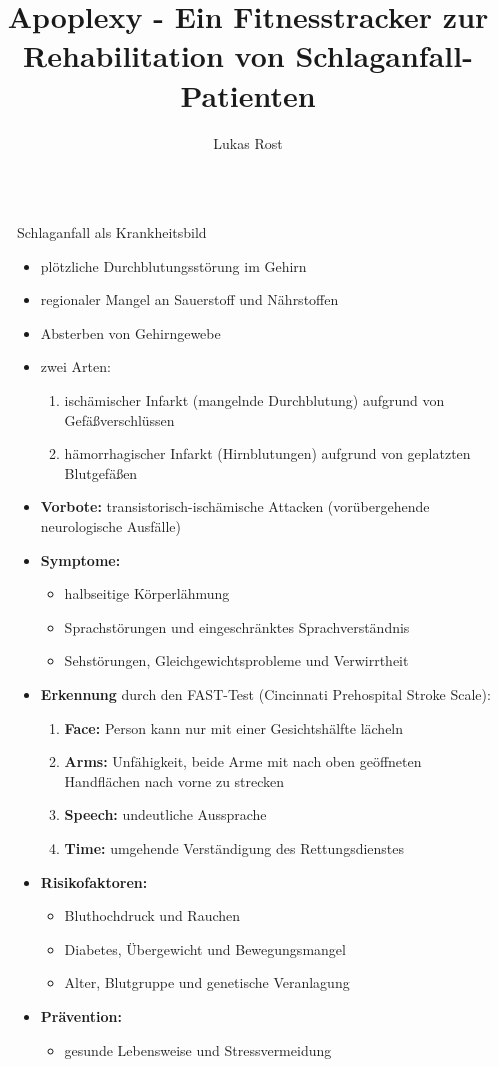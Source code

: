 \documentclass[final,20pt]{beamer}
\title{Apoplexy - Ein Fitnesstracker zur Rehabilitation von Schlaganfall-Patienten}
\author{Lukas Rost}
\institute{Albert-Schweitzer-Gymnasium Erfurt}
\newlength{\sepwidth}
\newlength{\colwidth}
\newcommand{\separatorcolumn}{\begin{column}{\sepwidth}\end{column}}
\begin{document}
\begin{frame}[t]
\begin{columns}[t]
\separatorcolumn

\begin{column}{\colwidth}

  \begin{alertblock}{Schlaganfall als Krankheitsbild}
  	\begin{itemize}
  		\item plötzliche Durchblutungsstörung im Gehirn
  		\item regionaler Mangel an Sauerstoff und Nährstoffen
  		\item Absterben von Gehirngewebe
  		\item zwei Arten:
  		\begin{enumerate}
  			\item ischämischer Infarkt (mangelnde Durchblutung) aufgrund von Gefäßverschlüssen
  			\item hämorrhagischer Infarkt (Hirnblutungen) aufgrund von geplatzten Blutgefäßen
  		\end{enumerate}
  		\item \textbf{Vorbote:} transistorisch-ischämische Attacken (vorübergehende neurologische Ausfälle)
  		\item \textbf{Symptome:}
  		\begin{itemize}
  			\item halbseitige Körperlähmung
  			\item Sprachstörungen und eingeschränktes Sprachverständnis
  			\item Sehstörungen, Gleichgewichtsprobleme und Verwirrtheit
  		\end{itemize}
  		\item \textbf{Erkennung} durch den FAST-Test (Cincinnati Prehospital Stroke Scale):
  		\begin{enumerate}
  			\item \textbf{Face:} Person kann nur mit einer Gesichtshälfte lächeln
  			\item \textbf{Arms:} Unfähigkeit, beide Arme mit nach oben geöffneten Handflächen nach vorne
  			zu strecken
  			\item \textbf{Speech:} undeutliche Aussprache
  			\item \textbf{Time:} umgehende Verständigung des Rettungsdienstes
  		\end{enumerate}
  		\item \textbf{Risikofaktoren:}
  		 \begin{itemize}
  		 	\item Bluthochdruck und Rauchen
  		 	\item Diabetes, Übergewicht und Bewegungsmangel
  		 	\item Alter, Blutgruppe und genetische Veranlagung
  		 \end{itemize}
  	 	\item \textbf{Prävention:}
  	 	\begin{itemize}
  	 		\item gesunde Lebensweise und Stressvermeidung
  	 	\end{itemize}
  	\end{itemize}
  

\end{alertblock}
\end{column}
\end{columns}
\end{frame}
\end{document}
